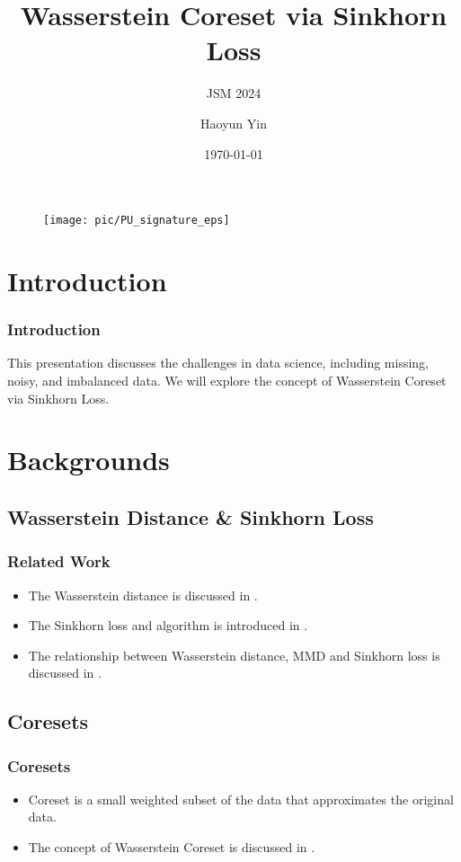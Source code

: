 \documentclass{beamer}
\author{Haoyun Yin}
\title{Wasserstein Coreset via Sinkhorn Loss}
\subtitle{JSM 2024}
\institute{Department of Statistics, Purdue University}
\date{\today}
\begin{document}
\begin{frame}
    \titlepage
    \begin{figure}[htpb]
        \begin{center}
            \texttt{[image: pic/PU\_signature\_eps]}
        \end{center}
    \end{figure}
\end{frame}

\begin{frame}
\tableofcontents[sectionstyle=show,
subsectionstyle=show/shaded/hide,
subsubsectionstyle=show/shaded/hide]
\end{frame}

\section{Introduction}

\begin{frame}
\frametitle{Introduction}
This presentation discusses the challenges in data science, including missing, noisy, and imbalanced data. We will explore the concept of Wasserstein Coreset via Sinkhorn Loss.
\end{frame}

\section{Backgrounds}

\subsection{Wasserstein Distance \& Sinkhorn Loss}
\begin{frame}[<+->]
\frametitle{Related Work}
\begin{itemize}
\item The Wasserstein distance is discussed in \citep{villani2009optimal}.
\item The Sinkhorn loss and algorithm is introduced in \citep{cuturi2013sinkhorn}.
\item The relationship between Wasserstein distance, MMD and Sinkhorn loss is discussed in \citep{feydy2019interpolating}.
\end{itemize}
\end{frame}

\subsection{Coresets}
\begin{frame}[<+->]
\frametitle{Coresets}
\begin{itemize}
    \item Coreset is a small weighted subset of the data that approximates the original data.
    \item The concept of Wasserstein Coreset is discussed in \citep{ClaiciSebastian2018WMC}.
\end{itemize}
\end{frame}
\end{document}
